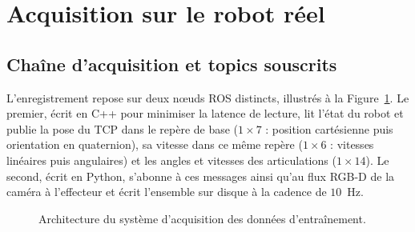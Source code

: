 \section*{Acquisition sur le robot réel}

\subsection*{Chaîne d'acquisition et topics souscrits} L'enregistrement repose sur deux n\oe uds \ac{ROS} distincts, illustrés à la Figure~\ref{fig:architecture_acquisition}. Le premier, écrit en C++ pour minimiser la latence de lecture, lit l'état du robot et publie la pose du \ac{TCP} dans le repère de base ($1\times7$ : position cartésienne puis orientation en quaternion), sa vitesse dans ce même repère ($1\times6$ : vitesses linéaires puis angulaires) et les angles et vitesses des articulations ($1\times14$). Le second, écrit en Python, s'abonne à ces messages ainsi qu'au flux \ac{RGB-D} de la caméra à l'effecteur et écrit l'ensemble sur disque à la cadence de $10$~Hz.

\begin{figure}[H]
    \centering
    \newcommand{\cube}[5]{%
        \begin{scope}[shift={(#1,#2)}]
            \def\dx{0.28}\def\dy{0.28}%
            \filldraw[fill=white] (0,#4) -- (\dx,#4+\dy) -- (#3+\dx,#4+\dy) -- (#3,#4) -- cycle;
            \filldraw[fill=white] (#3,#4) -- (#3+\dx,#4+\dy) -- (#3+\dx,\dy) -- (#3,0) -- cycle;
            \filldraw[fill=white] (0,0) rectangle (#3,#4);
            \node[align=center] at (#3/2,#4/2) {#5};
        \end{scope}%
    }
    \caption{Architecture du système d'acquisition des données d'entraînement.}\label{fig:architecture_acquisition}
\end{figure}

